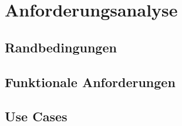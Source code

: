 \chapter{Anforderungsanalyse}
\label{Kap3}

\section{Randbedingungen}

\section{Funktionale Anforderungen}

\section{Use Cases}
